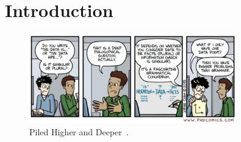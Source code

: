 
\chapter{Introduction}


\lipsum[1-3]

\begin{figure}[htb]
  \centering
    \includegraphics[width=0.8\textwidth]{figures/phd_comic.pdf}
  \caption{Piled Higher and Deeper~\cite{phdcomic}.}
\end{figure}

\lipsum[4-6]

